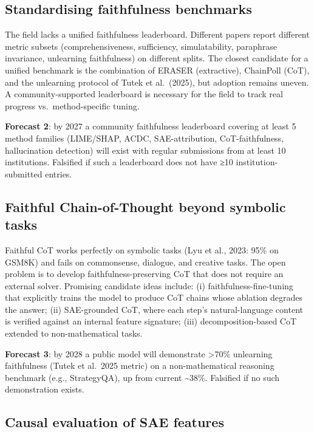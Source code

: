 \documentclass{article}
\begin{document}
\subsection{Standardising faithfulness benchmarks}\label{standardising-faithfulness-benchmarks}

The field lacks a unified faithfulness leaderboard. Different papers report different metric subsets (comprehensiveness, sufficiency, simulatability, paraphrase invariance, unlearning faithfulness) on different splits. The closest candidate for a unified benchmark is the combination of ERASER (extractive), ChainPoll (CoT), and the unlearning protocol of Tutek et al.~(2025), but adoption remains uneven. A community-supported leaderboard is necessary for the field to track real progress vs.~method-specific tuning.

\textbf{Forecast 2}: by 2027 a community faithfulness leaderboard covering at least 5 method families (LIME/SHAP, ACDC, SAE-attribution, CoT-faithfulness, hallucination detection) will exist with regular submissions from at least 10 institutions. Falsified if such a leaderboard does not have ≥10 institution-submitted entries.

\subsection{Faithful Chain-of-Thought beyond symbolic tasks}\label{faithful-chain-of-thought-beyond-symbolic-tasks}

Faithful CoT works perfectly on symbolic tasks (Lyu et al., 2023: 95\% on GSM8K) and fails on commonsense, dialogue, and creative tasks. The open problem is to develop faithfulness-preserving CoT that does not require an external solver. Promising candidate ideas include: (i) faithfulness-fine-tuning that explicitly trains the model to produce CoT chains whose ablation degrades the answer; (ii) SAE-grounded CoT, where each step's natural-language content is verified against an internal feature signature; (iii) decomposition-based CoT \citep{radhakrishnan2023questiondecomposit} extended to non-mathematical tasks.

\textbf{Forecast 3}: by 2028 a public model will demonstrate \textgreater70\% unlearning faithfulness (Tutek et al.~2025 metric) on a non-mathematical reasoning benchmark (e.g., StrategyQA), up from current \textasciitilde38\%. Falsified if no such demonstration exists.

\subsection{Causal evaluation of SAE features}\label{causal-evaluation-of-sae-features}
\end{document}

